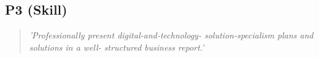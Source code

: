 \subsection{P3 (Skill)}

  \begin{quote}
    \textit{'Professionally present digital-and-technology-
    solution-specialism plans and solutions in a well-
    structured business report.'}
  \end{quote}

\newpage